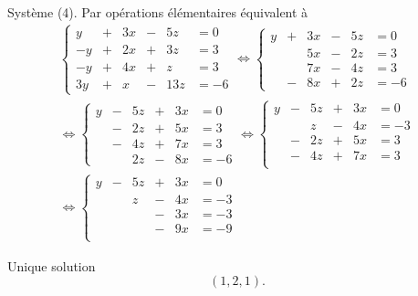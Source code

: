 Système (4). Par opérations élémentaires équivalent à
\begin{multline*}
  \left\lbrace 
  \begin{alignedat}{4}
    y &+& 3x &-& 5z &= 0\\
   -y &+& 2x &+& 3z &= 3\\
   -y &+& 4x &+& z  &= 3\\
   3y &+&  x &-& 13z &= -6
  \end{alignedat}
  \right.
\Leftrightarrow
  \left\lbrace 
  \begin{alignedat}{4}
    y &+& 3x &-& 5z &= 0\\
      & & 5x &-& 2z &= 3\\
      & & 7x &-& 4z &= 3\\
      &-& 8x &+& 2z &= -6
  \end{alignedat}
  \right. \\
  \Leftrightarrow
  \left\lbrace 
  \begin{alignedat}{4}
    y &-& 5z &+& 3x &= 0\\
      &-& 2z &+& 5x &= 3\\
      &-& 4z &+& 7x &= 3\\
      & & 2z &-& 8x &= -6
  \end{alignedat}
  \right.
  \Leftrightarrow
  \left\lbrace 
  \begin{alignedat}{4}
    y &-& 5z &+& 3x &= 0\\
      & & z  &-& 4x &= -3 \\
      &-& 2z &+& 5x &= 3\\
      &-& 4z &+& 7x &= 3\\
  \end{alignedat}
  \right. \\
  \Leftrightarrow
  \left\lbrace 
  \begin{alignedat}{4}
    y &-& 5z &+& 3x &= 0\\
      & & z  &-& 4x &= -3 \\
      & &    &-& 3x &= -3\\
      & &    &-& 9x &= -9\\
  \end{alignedat}
  \right.
\end{multline*}

Unique solution
\[
  (1,2,1).
\]
